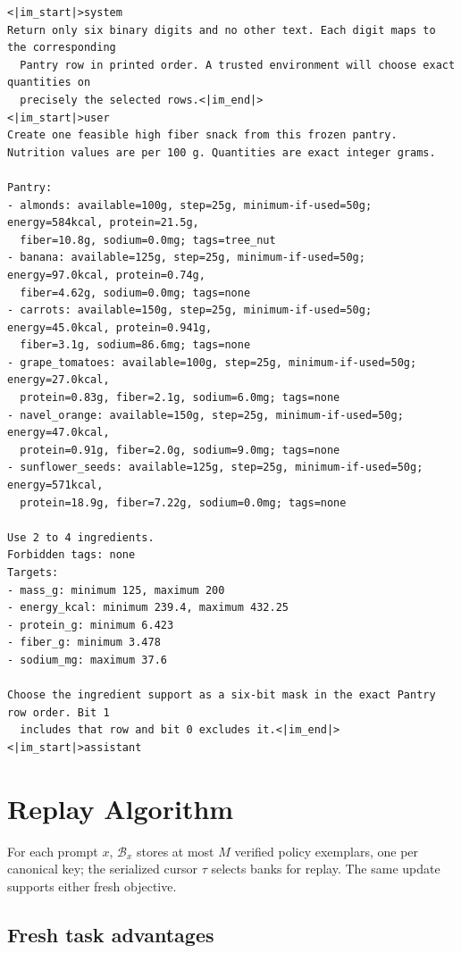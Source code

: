 \documentclass{article}
\newcommand{\1}{\mathbf 1}
\theoremstyle{remark}
\theoremstyle{definition}
\theoremstyle{plain}
\begin{document}
\begin{Verbatim}[fontsize=\scriptsize,frame=single,framesep=4pt,rulecolor=\color{black!25}]
<|im_start|>system
Return only six binary digits and no other text. Each digit maps to the corresponding
  Pantry row in printed order. A trusted environment will choose exact quantities on
  precisely the selected rows.<|im_end|>
<|im_start|>user
Create one feasible high fiber snack from this frozen pantry.
Nutrition values are per 100 g. Quantities are exact integer grams.

Pantry:
- almonds: available=100g, step=25g, minimum-if-used=50g; energy=584kcal, protein=21.5g,
  fiber=10.8g, sodium=0.0mg; tags=tree_nut
- banana: available=125g, step=25g, minimum-if-used=50g; energy=97.0kcal, protein=0.74g,
  fiber=4.62g, sodium=0.0mg; tags=none
- carrots: available=150g, step=25g, minimum-if-used=50g; energy=45.0kcal, protein=0.941g,
  fiber=3.1g, sodium=86.6mg; tags=none
- grape_tomatoes: available=100g, step=25g, minimum-if-used=50g; energy=27.0kcal,
  protein=0.83g, fiber=2.1g, sodium=6.0mg; tags=none
- navel_orange: available=150g, step=25g, minimum-if-used=50g; energy=47.0kcal,
  protein=0.91g, fiber=2.0g, sodium=9.0mg; tags=none
- sunflower_seeds: available=125g, step=25g, minimum-if-used=50g; energy=571kcal,
  protein=18.9g, fiber=7.22g, sodium=0.0mg; tags=none

Use 2 to 4 ingredients.
Forbidden tags: none
Targets:
- mass_g: minimum 125, maximum 200
- energy_kcal: minimum 239.4, maximum 432.25
- protein_g: minimum 6.423
- fiber_g: minimum 3.478
- sodium_mg: maximum 37.6

Choose the ingredient support as a six-bit mask in the exact Pantry row order. Bit 1
  includes that row and bit 0 excludes it.<|im_end|>
<|im_start|>assistant
\end{Verbatim}


\section{Replay Algorithm}
\label{app:algorithm}
\label{app:replay-objective}

For each prompt $x$, $\mathcal B_x$ stores at most $M$ verified policy
exemplars, one per canonical key; the serialized cursor $\tau$ selects
banks for replay. The same update supports either fresh objective.

\subsection{Fresh task advantages}
\label{app:binary-maxrl}
\end{document}
